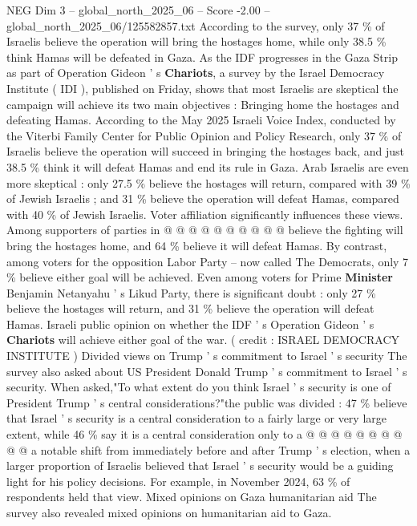 \begin{textsample}{NEG Dim 3 – global\_north\_2025\_06 – Score -2.00 – global\_north\_2025\_06/125582857.txt}  \label{ex:f3_neg_348}
According to the survey, only 37 \% of Israelis believe the operation will bring the hostages home, while only 38.5 \% think Hamas will be defeated in Gaza.
As the IDF progresses in the Gaza Strip as part of Operation Gideon ' s \textbf{Chariots}, a survey by the Israel Democracy Institute ( IDI ), published on Friday, shows that most Israelis are skeptical the campaign will achieve its two main objectives : Bringing home the hostages and defeating Hamas.
According to the May 2025 Israeli Voice Index, conducted by the Viterbi Family Center for Public Opinion and Policy Research, only 37 \% of Israelis believe the operation will succeed in bringing the hostages back, and just 38.5 \% think it will defeat Hamas and end its rule in Gaza.
Arab Israelis are even more skeptical : only 27.5 \% believe the hostages will return, compared with 39 \% of Jewish Israelis ; and 31 \% believe the operation will defeat Hamas, compared with 40 \% of Jewish Israelis.
Voter affiliation significantly influences these views.
Among supporters of parties in @ @ @ @ @ @ @ @ @ @ believe the fighting will bring the hostages home, and 64 \% believe it will defeat Hamas.
By contrast, among voters for the opposition Labor Party -- now called The Democrats, only 7 \% believe either goal will be achieved.
Even among voters for Prime \textbf{Minister} Benjamin Netanyahu ' s Likud Party, there is significant doubt : only 27 \% believe the hostages will return, and 31 \% believe the operation will defeat Hamas.
Israeli public opinion on whether the IDF ' s Operation Gideon ' s \textbf{Chariots} will achieve either goal of the war. ( credit : ISRAEL DEMOCRACY INSTITUTE ) Divided views on Trump ' s commitment to Israel ' s security The survey also asked about US President Donald Trump ' s commitment to Israel ' s security.
When asked,"To what extent do you think Israel ' s security is one of President Trump ' s central considerations?"the public was divided : 47 \% believe that Israel ' s security is a central consideration to a fairly large or very large extent, while 46 \% say it is a central consideration only to a @ @ @ @ @ @ @ @ @ @ a notable shift from immediately before and after Trump ' s election, when a larger proportion of Israelis believed that Israel ' s security would be a guiding light for his policy decisions.
For example, in November 2024, 63 \% of respondents held that view.
Mixed opinions on Gaza humanitarian aid The survey also revealed mixed opinions on humanitarian aid to Gaza.

\end{textsample}
